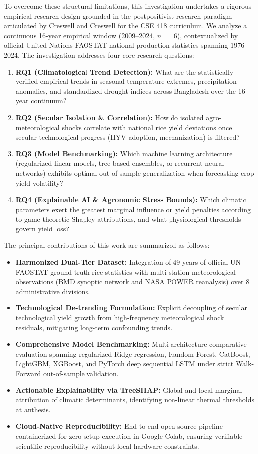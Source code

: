 \documentclass[conference]{IEEEtran}
\begin{document}
To overcome these structural limitations, this investigation undertakes a rigorous empirical research design grounded in the postpositivist research paradigm articulated by Creswell and Creswell \cite{creswell2018research} for the CSE 418 curriculum. We analyze a continuous 16-year empirical window (2009--2024, $n=16$), contextualized by official United Nations FAOSTAT national production statistics spanning 1976--2024. The investigation addresses four core research questions:
\begin{enumerate}
    \item \textbf{RQ1 (Climatological Trend Detection):} What are the statistically verified empirical trends in seasonal temperature extremes, precipitation anomalies, and standardized drought indices across Bangladesh over the 16-year continuum?
    \item \textbf{RQ2 (Secular Isolation \& Correlation):} How do isolated agro-meteorological shocks correlate with national rice yield deviations once secular technological progress (HYV adoption, mechanization) is filtered?
    \item \textbf{RQ3 (Model Benchmarking):} Which machine learning architecture (regularized linear models, tree-based ensembles, or recurrent neural networks) exhibits optimal out-of-sample generalization when forecasting crop yield volatility?
    \item \textbf{RQ4 (Explainable AI \& Agronomic Stress Bounds):} Which climatic parameters exert the greatest marginal influence on yield penalties according to game-theoretic Shapley attributions, and what physiological thresholds govern yield loss?
\end{enumerate}

The principal contributions of this work are summarized as follows:
\begin{itemize}
    \item \textbf{Harmonized Dual-Tier Dataset:} Integration of 49 years of official UN FAOSTAT ground-truth rice statistics with multi-station meteorological observations (BMD synoptic network and NASA POWER reanalysis) over 8 administrative divisions.
    \item \textbf{Technological De-trending Formulation:} Explicit decoupling of secular technological yield growth from high-frequency meteorological shock residuals, mitigating long-term confounding trends.
    \item \textbf{Comprehensive Model Benchmarking:} Multi-architecture comparative evaluation spanning regularized Ridge regression, Random Forest, CatBoost, LightGBM, XGBoost, and PyTorch deep sequential LSTM under strict Walk-Forward out-of-sample validation.
    \item \textbf{Actionable Explainability via TreeSHAP:} Global and local marginal attribution of climatic determinants, identifying non-linear thermal thresholds at anthesis.
    \item \textbf{Cloud-Native Reproducibility:} End-to-end open-source pipeline containerized for zero-setup execution in Google Colab, ensuring verifiable scientific reproducibility without local hardware constraints.
\end{itemize}
\end{document}
